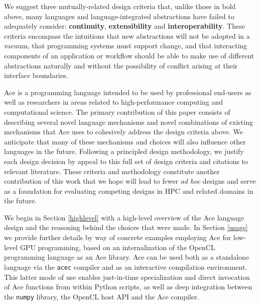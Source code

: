 \documentclass{sig-alternate}
\begin{document}
We suggest three mutually-related {design criteria} that, unlike those in bold above, many languages and language-integrated abstractions have failed to adequately consider: \textbf{continuity}, \textbf{extensibility} and \textbf{interoperability}. These criteria encompass the intuitions that new abstractions will not be adopted in a vacuum, that programming systems must  support change, and that interacting components of an application or workflow should be able to make use of different abstractions naturally and without the possibility of conflict arising at their interface boundaries.

Ace is a programming language intended to be used by professional end-users as well as researchers in areas related to high-performance computing and computational science. The primary contribution of this paper consists of describing several novel language mechanisms and novel combinations of existing mechanisms that Ace uses to cohesively address the design criteria above. We anticipate that many of these mechanisms and choices will also influence other languages in the future. 
Following a principled design methodology, we justify each design decision by appeal to this full set of design criteria and citations to relevant literature. These criteria and methodology constitute another contribution of this work that we hope  will lead to fewer \emph{ad hoc} designs and serve as a foundation for evaluating competing designs in HPC and related domains in the future.


We begin in Section \ref{highlevel} with a high-level overview of the Ace language design and the reasoning behind the choices that were made. In Section \ref{usage} we provide further details by way of concrete examples employing Ace for low-level GPU programming, based on an internalization of the OpenCL programming language as an Ace library. Ace can be used both as a standalone language via the \verb|acec| compiler and as an interactive compilation environment. This latter mode of use enables just-in-time specialization and direct invocation of Ace functions from within Python scripts, as well as deep integration between the \verb|numpy| library, the OpenCL host API and the Ace compiler.
\end{document}
